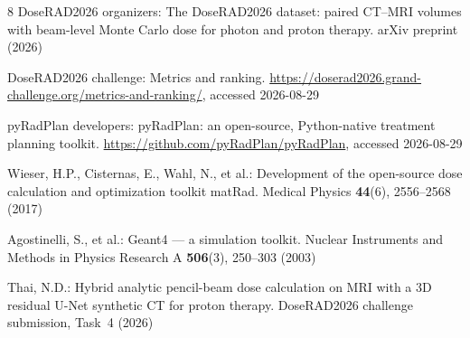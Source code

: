 \documentclass[runningheads]{llncs}
\begin{document}
\begin{thebibliography}{8}
DoseRAD2026 organizers: The DoseRAD2026 dataset: paired CT--MRI volumes with beam-level Monte Carlo dose for photon and proton therapy. arXiv preprint  (2026)

DoseRAD2026 challenge: Metrics and ranking. \url{https://doserad2026.grand-challenge.org/metrics-and-ranking/}, accessed 2026-08-29

pyRadPlan developers: pyRadPlan: an open-source, Python-native treatment planning toolkit. \url{https://github.com/pyRadPlan/pyRadPlan}, accessed 2026-08-29

Wieser, H.P., Cisternas, E., Wahl, N., et al.: Development of the open-source dose calculation and optimization toolkit matRad. Medical Physics \textbf{44}(6), 2556--2568 (2017)

Agostinelli, S., et al.: Geant4 --- a simulation toolkit. Nuclear Instruments and Methods in Physics Research A \textbf{506}(3), 250--303 (2003)

Thai, N.D.: Hybrid analytic pencil-beam dose calculation on MRI with a 3D residual U-Net synthetic CT for proton therapy. DoseRAD2026 challenge submission, Task~4 (2026)
\end{thebibliography}
\end{document}
